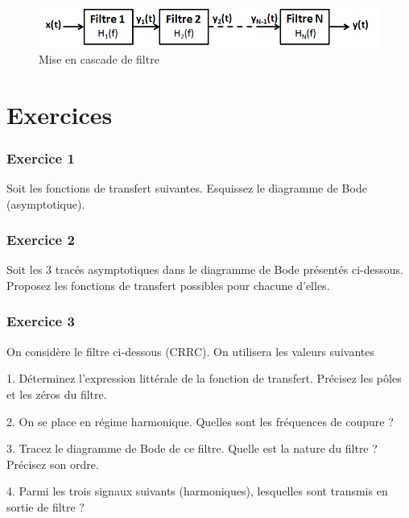 	
	\begin{figure}[h!]
		\centering
		\includegraphics[scale=0.6]{images/Cascade_filtre.png}
		\caption{Mise en cascade de filtre}	
		\label{Fig:Cascade_filtre} 
	\end{figure}

	
	

	
	
	\section{Exercices }
	
	\subsubsection{Exercice 1}
	Soit les fonctions de transfert suivantes. Esquissez le diagramme de Bode (asymptotique). 
	
	\vspace{1\baselineskip}
	
	\subsubsection{Exercice 2}
	Soit les 3 tracés asymptotiques dans le diagramme de Bode présentés ci-dessous. Proposez les fonctions de transfert possibles pour chacune d'elles. 
	
	\vspace{1\baselineskip}
	
	\subsubsection{Exercice 3}
	On considère le filtre ci-dessous (CRRC). On utilisera les valeurs suivantes
	
	1. Déterminez l'expression littérale de la fonction de transfert. Précisez les pôles et les zéros du filtre.
	
	2. On se place en régime harmonique. Quelles sont les fréquences de coupure ?
	
	3. Tracez le diagramme de Bode de ce filtre. Quelle est la nature du filtre ? Précisez son ordre.
	
	4. Parmi les trois signaux suivants (harmoniques), lesquelles sont transmis en sortie de filtre ?
	
